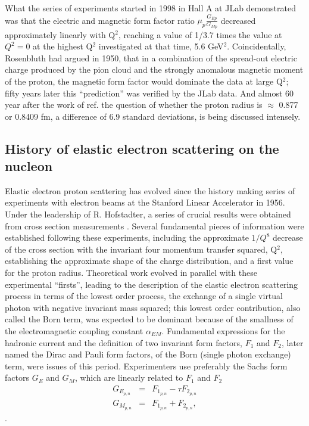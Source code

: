 What the series of experiments started in 1998 in Hall A at JLab demonstrated was that the electric and magnetic form
 factor ratio $\mu_p\frac{G_{Ep}}{G_{Mp}}$ decreased approximately linearly with Q$^2$, reaching a value of 1/3.7 times the value
 at $Q^2=0$ at the highest Q$^2$ investigated  at that time, 5.6 GeV$^2$. Coincidentally, Rosenbluth \cite{rosenbluth}
 had argued in 1950, that in a combination
of the spread-out electric charge produced by the pion cloud and the strongly anomalous magnetic moment of the proton, 
the magnetic form factor would dominate the data at large Q$^2$; fifty years later this ``prediction'' was verified by the JLab data.
And almost 60 year after the work of ref. \cite{hofstadter56} the 
question of whether the proton radius is $\approx$ 0.877 or 0.8409 fm, a difference of 6.9 standard deviations,
is being discussed intensely.

\subsection{History of elastic electron scattering on the nucleon}

Elastic electron proton scattering has evolved since the history making series of experiments with electron beams at the
 Stanford Linear Accelerator in 1956. 
Under the leadership of R. Hofstadter, a series of crucial results were obtained from cross section measurements \cite{hofs53}. 
Several fundamental pieces of information were established following these experiments, including the approximate $1/Q^8$
decrease of the cross section with the invariant four momentum transfer squared, Q$^2$, establishing the approximate shape
 of the charge distribution, and a first value for the proton radius. Theoretical
work evolved in parallel with these experimental ``firsts'', leading to the description of the elastic electron scattering
 process in terms of the lowest order process,  the exchange of a single virtual
photon with negative invariant mass squared; this lowest order contribution, also called the Born term, was expected to be dominant
 because of the smallness of the electromagnetic coupling constant $\alpha_{EM}$.  Fundamental expressions for the hadronic current
 and the definition of two invariant
form factors, $F_1$ and $F_2$, later named the Dirac and Pauli form factors, of the Born (single photon exchange) term, were issues
 of this period. Experimenters use preferably the Sachs form factors $G_{E}$ and $G_{M}$, which are linearly related to $F_1$ and $F_2$
\begin{eqnarray}
G_{E_{p,n}}& = & F_{1_{p,n}}-\tau F_{2_{p,n}} \nonumber \\
G_{M_{p,n}}& = & F_{1_{p,n}}+F_{2_{p,n}},
\label{eq:gepgmp}
\end {eqnarray}
\noindent.

